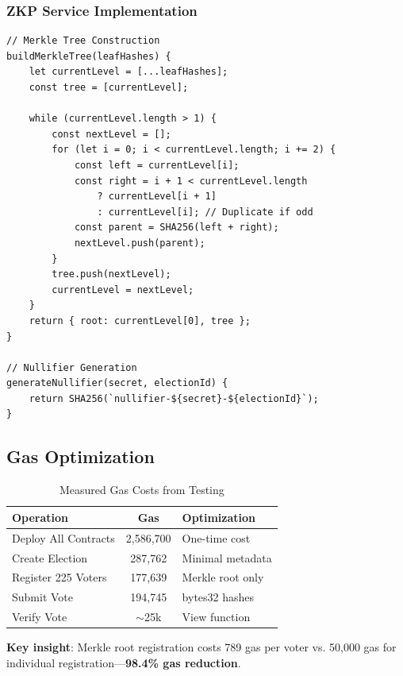 \documentclass[conference]{IEEEtran}
\begin{document}
\subsubsection{ZKP Service Implementation}

\begin{lstlisting}[style=solidity, caption={ZKP Service Core Functions (JavaScript)}]
// Merkle Tree Construction
buildMerkleTree(leafHashes) {
    let currentLevel = [...leafHashes];
    const tree = [currentLevel];
    
    while (currentLevel.length > 1) {
        const nextLevel = [];
        for (let i = 0; i < currentLevel.length; i += 2) {
            const left = currentLevel[i];
            const right = i + 1 < currentLevel.length 
                ? currentLevel[i + 1] 
                : currentLevel[i]; // Duplicate if odd
            const parent = SHA256(left + right);
            nextLevel.push(parent);
        }
        tree.push(nextLevel);
        currentLevel = nextLevel;
    }
    return { root: currentLevel[0], tree };
}

// Nullifier Generation
generateNullifier(secret, electionId) {
    return SHA256(`nullifier-${secret}-${electionId}`);
}
\end{lstlisting}

\subsection{Gas Optimization}

\begin{table}[htbp]
\caption{Measured Gas Costs from Testing}
\centering
\footnotesize
\begin{tabular}{|p{2.5cm}|c|p{3cm}|}
\hline
\textbf{Operation} & \textbf{Gas} & \textbf{Optimization} \\
\hline
Deploy All Contracts & 2,586,700 & One-time cost \\
\hline
Create Election & 287,762 & Minimal metadata \\
\hline
Register 225 Voters & 177,639 & Merkle root only \\
\hline
Submit Vote & 194,745 & bytes32 hashes \\
\hline
Verify Vote & $\sim$25k & View function \\
\hline
\end{tabular}
\end{table}

\textbf{Key insight}: Merkle root registration costs 789 gas per voter vs. 50,000 gas for individual registration---\textbf{98.4\% gas reduction}.
\end{document}
